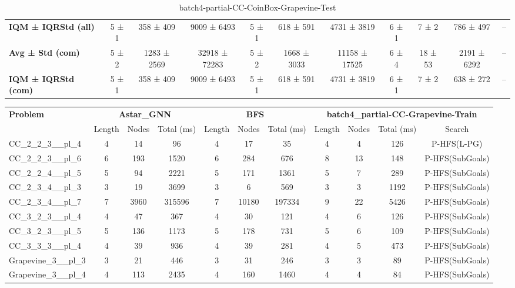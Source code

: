 \begin{table}[!ht]
\begin{tabular}{l|ccc|ccc|cccc}
\textbf{IQM ± IQRStd (all)} & 5 ± 1 & 358 ± 409 & 9009 ± 6493 & 5 ± 1 & 618 ± 591 & 4731 ± 3819 & 6 ± 1 & 7 ± 2 & 786 ± 497 & -- \\
\textbf{Avg ± Std (com)} & 5 ± 2 & 1283 ± 2569 & 32918 ± 72283 & 5 ± 2 & 1668 ± 3033 & 11158 ± 17525 & 6 ± 4 & 18 ± 53 & 2191 ± 6292 & -- \\
\textbf{IQM ± IQRStd (com)} & 5 ± 1 & 358 ± 409 & 9009 ± 6493 & 5 ± 1 & 618 ± 591 & 4731 ± 3819 & 6 ± 1 & 7 ± 2 & 638 ± 272 & -- \\
\end{tabular}
\caption{batch4-partial-CC-CoinBox-Grapevine-Test}
\label{tab:batch4_partial_CC-CoinBox-Grapevine_comparison_test}
\end{table}

\begin{table}[!ht]
\centering
\scriptsize
\begin{tabular}{l|ccc|ccc|cccc}
\multirow{2}{*}{\textbf{Problem}} & \multicolumn{3}{c|}{\textbf{Astar\_GNN}} & \multicolumn{3}{c|}{\textbf{BFS}} & \multicolumn{4}{c}{\textbf{batch4\_partial-CC-Grapevine-Train}} \\
\cline{2-11}
& Length & Nodes & Total (ms) & Length & Nodes & Total (ms) & Length & Nodes & Total (ms) & Search \\
\hline
CC\_2\_2\_3\_\_pl\_4 & 4 & 14 & 96 & 4 & 17 & 35 & 4 & 4 & 126 & P-HFS(L-PG) \\
CC\_2\_2\_3\_\_pl\_6 & 6 & 193 & 1520 & 6 & 284 & 676 & 8 & 13 & 148 & P-HFS(SubGoals) \\
CC\_2\_2\_4\_\_pl\_5 & 5 & 94 & 2221 & 5 & 171 & 1361 & 5 & 7 & 289 & P-HFS(SubGoals) \\
CC\_2\_3\_4\_\_pl\_3 & 3 & 19 & 3699 & 3 & 6 & 569 & 3 & 3 & 1192 & P-HFS(SubGoals) \\
CC\_2\_3\_4\_\_pl\_7 & 7 & 3960 & 315596 & 7 & 10180 & 197334 & 9 & 22 & 5426 & P-HFS(SubGoals) \\
CC\_3\_2\_3\_\_pl\_4 & 4 & 47 & 367 & 4 & 30 & 121 & 4 & 6 & 126 & P-HFS(SubGoals) \\
CC\_3\_2\_3\_\_pl\_5 & 5 & 136 & 1173 & 5 & 178 & 731 & 5 & 6 & 109 & P-HFS(SubGoals) \\
CC\_3\_3\_3\_\_pl\_4 & 4 & 39 & 936 & 4 & 39 & 281 & 4 & 5 & 473 & P-HFS(SubGoals) \\
Grapevine\_3\_\_pl\_3 & 3 & 21 & 446 & 3 & 31 & 246 & 3 & 3 & 89 & P-HFS(SubGoals) \\
Grapevine\_3\_\_pl\_4 & 4 & 113 & 2435 & 4 & 160 & 1460 & 4 & 4 & 84 & P-HFS(SubGoals) \\

\end{tabular}
\end{table}
